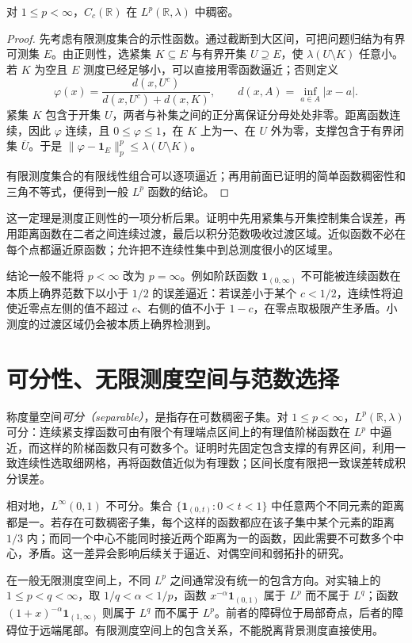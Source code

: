 \begin{theorem}
对 $1\leq p<\infty$，$C_c(\mathbb R)$ 在 $L^p(\mathbb R,\lambda)$ 中稠密。
\label{thm:mt-cc-density}
\end{theorem}
\begin{proof}
先考虑有限测度集合的示性函数。通过截断到大区间，可把问题归结为有界可测集 $E$。由正则性，选紧集 $K\subseteq E$ 与有界开集 $U\supseteq E$，使 $\lambda(U\setminus K)$ 任意小。若 $K$ 为空且 $E$ 测度已经足够小，可以直接用零函数逼近；否则定义
\[
 \varphi(x)=\frac{d(x,U^c)}{d(x,U^c)+d(x,K)},\qquad
 d(x,A)=\inf_{a\in A}|x-a|.
\]
紧集 $K$ 包含于开集 $U$，两者与补集之间的正分离保证分母处处非零。距离函数连续，因此 $\varphi$ 连续，且 $0\leq\varphi\leq1$，在 $K$ 上为一、在 $U$ 外为零，支撑包含于有界闭集 $\overline U$。于是
$\|\varphi-\mathbf1_E\|_p^p\leq\lambda(U\setminus K)$。

有限测度集合的有限线性组合可以逐项逼近；再用前面已证明的简单函数稠密性和三角不等式，便得到一般 $L^p$ 函数的结论。
\end{proof}
这一定理是测度正则性的一项分析后果。证明中先用紧集与开集控制集合误差，再用距离函数在二者之间连续过渡，最后以积分范数吸收过渡区域。近似函数不必在每个点都逼近原函数；允许把不连续性集中到总测度很小的区域里。

结论一般不能将 $p<\infty$ 改为 $p=\infty$。例如阶跃函数 $\mathbf1_{(0,\infty)}$ 不可能被连续函数在本质上确界范数下以小于 $1/2$ 的误差逼近：若误差小于某个 $c<1/2$，连续性将迫使近零点左侧的值不超过 $c$、右侧的值不小于 $1-c$，在零点取极限产生矛盾。小测度的过渡区域仍会被本质上确界检测到。

\section{可分性、无限测度空间与范数选择}
称度量空间\emph{可分（separable）}，是指存在可数稠密子集。对 $1\leq p<\infty$，$L^p(\mathbb R,\lambda)$ 可分：连续紧支撑函数可由有限个有理端点区间上的有理值阶梯函数在 $L^p$ 中逼近，而这样的阶梯函数只有可数多个。证明时先固定包含支撑的有界区间，利用一致连续性选取细网格，再将函数值近似为有理数；区间长度有限把一致误差转成积分误差。

相对地，$L^\infty(0,1)$ 不可分。集合 $\{\mathbf1_{(0,t)}:0<t<1\}$ 中任意两个不同元素的距离都是一。若存在可数稠密子集，每个这样的函数都应在该子集中某个元素的距离 $1/3$ 内；而同一个中心不能同时接近两个距离为一的函数，因此需要不可数多个中心，矛盾。这一差异会影响后续关于逼近、对偶空间和弱拓扑的研究。

在一般无限测度空间上，不同 $L^p$ 之间通常没有统一的包含方向。对实轴上的 $1\leq p<q<\infty$，取 $1/q<\alpha<1/p$，函数 $x^{-\alpha}\mathbf1_{(0,1)}$ 属于 $L^p$ 而不属于 $L^q$；函数 $(1+x)^{-\alpha}\mathbf1_{(1,\infty)}$ 则属于 $L^q$ 而不属于 $L^p$。前者的障碍位于局部奇点，后者的障碍位于远端尾部。有限测度空间上的包含关系，不能脱离背景测度直接使用。

